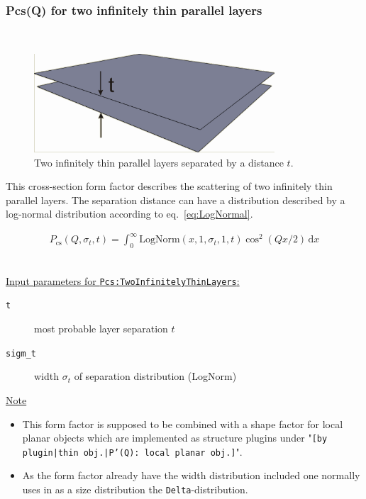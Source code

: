 \clearpage
\subsubsection{Pcs(Q) for two infinitely thin parallel layers} ~\\
\label{plugin:Pcs:TwoInfinitelyThinLayers}

\begin{figure}[htb]
\begin{center}
\includegraphics[width=0.8\textwidth,height=0.328\textwidth]{../images/form_factor/anisotropic/planar2thin_txt.png}
\end{center}
\caption{Two infinitely thin parallel layers separated by a distance $t$.}
\label{fig:Pcs:TwoInfinitelyThinLayers}
\end{figure}

This cross-section form factor describes the scattering of two infinitely thin parallel layers.
The separation distance can have a distribution described by a log-normal distribution according
to eq.\ \ref{eq:LogNormal}.

\begin{align}
P_\text{cs}(Q,\sigma_{t},t) = \int_0^\infty \textrm{LogNorm}(x,1,\sigma_{t},1,t) \cos^2(Qx/2) \, \textrm{d}x
\end{align}

\vspace{5mm}

\hspace{1pt}\\
\uline{Input parameters for \texttt{Pcs:TwoInfinitelyThinLayers}:}
\begin{description}
    \item[\texttt{t}] most probable layer separation $t$
    \item[\texttt{sigm\_t}] width $\sigma_t$ of separation distribution (LogNorm)
\end{description}

\noindent
\uline{Note}
\begin{itemize}
  \item This form factor is supposed to be combined with a shape factor for
local planar objects which are implemented as structure  plugins
under "\texttt{[by plugin|thin obj.|P'(Q): local planar
obj.]}".
\item As the form factor already have the width distribution included one normally uses in \SASfit as a size distribution
the \texttt{Delta}-distribution.
\end{itemize}

